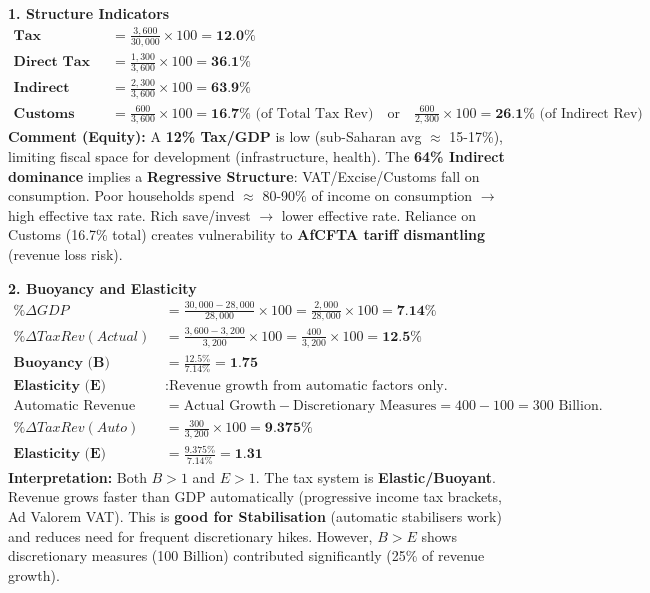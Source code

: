 \documentclass[11pt]{article}
\begin{document}
\begin{exoresolu}
\textbf{1. Structure Indicators}
\begin{align*}
\textbf{Tax Pressure} &= \frac{3,600}{30,000} \times 100 = \textbf{12.0\%} \\
\textbf{Direct Tax Share} &= \frac{1,300}{3,600} \times 100 = \textbf{36.1\%} \\
\textbf{Indirect Tax Share} &= \frac{2,300}{3,600} \times 100 = \textbf{63.9\%} \\
\textbf{Customs Dependence} &= \frac{600}{3,600} \times 100 = \textbf{16.7\%} \text{ (of Total Tax Rev)} \quad \text{or} \quad \frac{600}{2,300} \times 100 = \textbf{26.1\%} \text{ (of Indirect Rev)}
\end{align*}
\textbf{Comment (Equity):} A \textbf{12\% Tax/GDP} is low (sub-Saharan avg $\approx$ 15-17\%), limiting fiscal space for development (infrastructure, health). The \textbf{64\% Indirect dominance} implies a \textbf{Regressive Structure}: VAT/Excise/Customs fall on consumption. Poor households spend $\approx$ 80-90\% of income on consumption $\rightarrow$ high effective tax rate. Rich save/invest $\rightarrow$ lower effective rate. Reliance on Customs (16.7\% total) creates vulnerability to \textbf{AfCFTA tariff dismantling} (revenue loss risk).

\textbf{2. Buoyancy and Elasticity}
\begin{align*}
\% \Delta GDP &= \frac{30,000 - 28,000}{28,000} \times 100 = \frac{2,000}{28,000} \times 100 = \textbf{7.14\%} \\
\% \Delta Tax Rev (Actual) &= \frac{3,600 - 3,200}{3,200} \times 100 = \frac{400}{3,200} \times 100 = \textbf{12.5\%} \\
\textbf{Buoyancy (B)} &= \frac{12.5\%}{7.14\%} = \textbf{1.75} \\
\textbf{Elasticity (E)} &: \text{Revenue growth from automatic factors only.} \\
\text{Automatic Revenue Growth} &= \text{Actual Growth} - \text{Discretionary Measures} = 400 - 100 = 300 \text{ Billion}. \\
\% \Delta Tax Rev (Auto) &= \frac{300}{3,200} \times 100 = \textbf{9.375\%} \\
\textbf{Elasticity (E)} &= \frac{9.375\%}{7.14\%} = \textbf{1.31}
\end{align*}
\textbf{Interpretation:} Both $B > 1$ and $E > 1$. The tax system is \textbf{Elastic/Buoyant}. Revenue grows faster than GDP automatically (progressive income tax brackets, Ad Valorem VAT). This is \textbf{good for Stabilisation} (automatic stabilisers work) and reduces need for frequent discretionary hikes. However, $B > E$ shows discretionary measures (100 Billion) contributed significantly (25\% of revenue growth).


\end{exoresolu}
\end{document}
